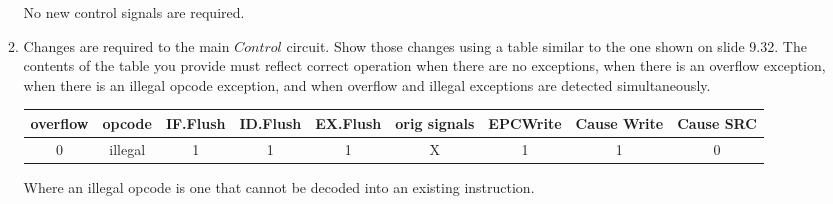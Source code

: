 \documentclass[10pt,letterpaper]{article}
\begin{document}
\begin{enumerate}[label=\textbf{Problem \arabic*.}]
\begin{enumerate}[label=\Alph*)]
	No new control signals are required.
	\item Changes are required to the main $Control$ circuit. Show those changes using a table similar to the one shown on slide 9.32. The contents of the table you provide must reflect correct operation when there are no exceptions, when there is an overflow exception, when there is an illegal opcode exception, and when overflow and illegal exceptions are detected simultaneously.
	\hspace*{-1.5cm}\begin{tabular}{|c|c|c|c|c|c|c|c|c|}
	\hline
	overflow & opcode & IF.Flush & ID.Flush & EX.Flush & orig signals & EPCWrite & Cause Write & Cause SRC \\
	\hline
	0 & illegal & 1 & 1 & 1 & X & 1 & 1 & 0 \\
	\hline
	\end{tabular}
	Where an illegal opcode is one that cannot be decoded into an existing instruction.
	\end{enumerate}
\end{enumerate}
\end{document}
